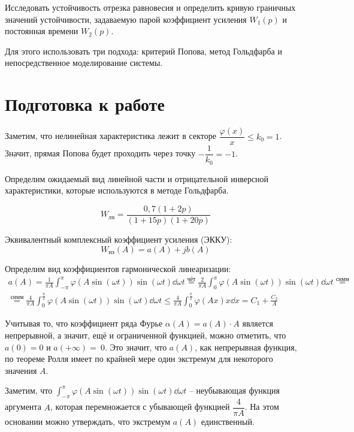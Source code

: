 	Исследовать устойчивость отрезка равновесия и определить кривую граничных значений устойчивости, задаваемую парой коэффициент усиления $W_1(p)$ и постоянная времени $W_2(p)$.
	
	Для этого использовать три подхода: критерий Попова, метод Гольдфарба и непосредственное моделирование системы.
	
	\section{Подготовка к работе}
	
	Заметим, что нелинейная характеристика лежит в секторе $\dfrac{\varphi(x)}{x} \leq k_0 = 1$. Значит, прямая Попова будет проходить через точку $-\dfrac{1}{k_0} = -1$.
	
	Определим ожидаемый вид линейной части и отрицательной инверсной характеристики, которые используются в методе Гольдфарба.
	
	\begin{equation*}
		W_\text{лч} = \frac{0,7(1+2p)}{(1+15p)(1+20p)}
	\end{equation*}
	
	Эквивалентный комплексный коэффициент усиления (ЭККУ):
	\begin{equation*}
		W_\text{нэ}(A) = a(A) + jb(A)
	\end{equation*}
	
	Определим вид коэффициентов гармонической линеаризации:
	\begin{multline*}
		a(A) = \frac{1}{\pi A} \int_{-\pi}^\pi \varphi(A\sin{(\omega t)})\sin{(\omega t)}\dd{\omega t}\stackrel{\text{чёт}}{=} 
		\frac{2}{\pi A} \int_{0}^\pi \varphi(A\sin{(\omega t)})\sin{(\omega t)}\dd{\omega t} \stackrel{\text{симм}}{=} \\
		\stackrel{\text{симм}}{=} \frac{4}{\pi A} \int_{0}^{\frac{\pi}{2}} \varphi(A\sin{(\omega t)})\sin{(\omega t)}\dd{\omega t} \leq 
		\frac{4}{\pi A} \int_{0}^{\frac{\pi}{2}} \varphi(Ax)x\dd{x} = C_1 + \frac{C_2}{A}
	\end{multline*}
	
	Учитывая то, что коэффициент ряда Фурье $\alpha(A) = a(A)\cdot A$ является непрерывной, а значит, ещё и ограниченной функцией, можно отметить, что $a(0) = 0$ и $a(+\infty) =~0$. Это значит, что $a(A)$, как непрерывная функция, по теореме Ролля имеет по крайней мере один экстремум для некоторого значения $A$.
	
	Заметим, что $\int_{-\pi}^\pi \varphi(A\sin{(\omega t)})\sin{(\omega t)}\dd{\omega t}$ -- неубывающая функция аргумента $A$, которая перемножается с убывающей функцией $\dfrac{4}{\pi A}$. На этом основании можно утверждать, что экстремум $a(A)$ единственный.
		
